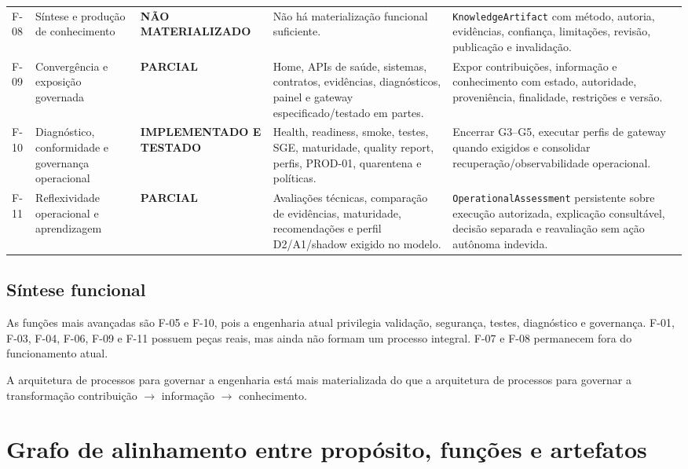 \documentclass[11pt,a4paper,oneside]{article}
\newcommand{\statustestado}{\textcolor{sisterblue}{\textbf{IMPLEMENTADO E TESTADO}}}
\newcommand{\statusparcial}{\textcolor{sisteramber}{\textbf{PARCIAL}}}
\newcommand{\statusausente}{\textcolor{sisterred}{\textbf{NÃO MATERIALIZADO}}}
\begin{document}
\begin{landscape}
\begin{longtable}{P{1.25cm}P{4.1cm}P{3.3cm}P{7.2cm}P{6.0cm}}
F-08 & Síntese e produção de conhecimento & \statusausente & Não há materialização funcional suficiente. & \texttt{KnowledgeArtifact} com método, autoria, evidências, confiança, limitações, revisão, publicação e invalidação. \\
F-09 & Convergência e exposição governada & \statusparcial & Home, APIs de saúde, sistemas, contratos, evidências, diagnósticos, painel e gateway especificado/testado em partes. & Expor contribuições, informação e conhecimento com estado, autoridade, proveniência, finalidade, restrições e versão. \\
F-10 & Diagnóstico, conformidade e governança operacional & \statustestado & Health, readiness, smoke, testes, SGE, maturidade, quality report, perfis, PROD-01, quarentena e políticas. & Encerrar G3--G5, executar perfis de gateway quando exigidos e consolidar recuperação/observabilidade operacional. \\
F-11 & Reflexividade operacional e aprendizagem & \statusparcial & Avaliações técnicas, comparação de evidências, maturidade, recomendações e perfil D2/A1/shadow exigido no modelo. & \texttt{OperationalAssessment} persistente sobre execução autorizada, explicação consultável, decisão separada e reavaliação sem ação autônoma indevida. \\
\bottomrule
\end{longtable}
\end{landscape}

\subsection{Síntese funcional}

As funções mais avançadas são F-05 e F-10, pois a engenharia atual privilegia validação, segurança, testes, diagnóstico e governança. F-01, F-03, F-04, F-06, F-09 e F-11 possuem peças reais, mas ainda não formam um processo integral. F-07 e F-08 permanecem fora do funcionamento atual.

\begin{principio}
A arquitetura de processos para governar a engenharia está mais materializada do que a arquitetura de processos para governar a transformação contribuição $\rightarrow$ informação $\rightarrow$ conhecimento.
\end{principio}

\section{Grafo de alinhamento entre propósito, funções e artefatos}
\end{document}
